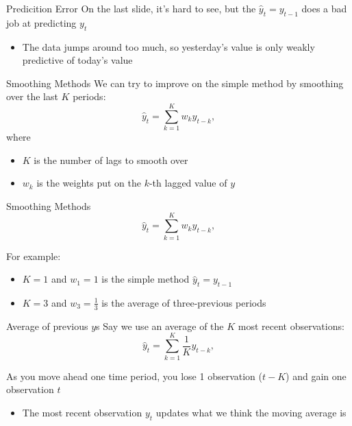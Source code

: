 \documentclass[aspectratio=169,t,11pt,table]{beamer}
\begin{document}

\begin{frame}{Predicition Error}
  On the last slide, it's hard to see, but the $\hat{y}_t = y_{t-1}$ does a bad job at predicting $y_t$
  \begin{itemize}
    \item The data jumps around too much, so yesterday's value is only weakly predictive of today's value
  \end{itemize}
\end{frame}

\begin{frame}{Smoothing Methods}
  We can try to improve on the simple method by smoothing over the last $K$ periods:
  $$
    \hat{y}_t = \sum_{k=1}^K w_k y_{t - k},
  $$
  where 
  \begin{itemize}
    \item $K$ is the number of lags to smooth over
    \item $w_k$ is the weights put on the $k$-th lagged value of $y$
  \end{itemize}
\end{frame}

\begin{frame}{Smoothing Methods}
  \vspace*{-\bigskipamount}
  $$
    \hat{y}_t = \sum_{k=1}^K w_k y_{t - k},
  $$
  
  \bigskip
  For example: 
  \begin{itemize}
    \item $K = 1$ and $w_1 = 1$ is the simple method $\hat{y}_t = y_{t-1}$
    
    \pause
    \item $K = 3$ and $w_3 = \frac{1}{3}$ is the average of three-previous periods
  \end{itemize}
\end{frame}

\begin{frame}{Average of previous $y$s}
  Say we use an average of the $K$ most recent observations:
  $$
    \hat{y}_t = \sum_{k=1}^K \frac{1}{K} y_{t - k},
  $$

  \pause
  \bigskip
  As you move ahead one time period, you lose 1 observation ($t - K$) and gain one observation $t$
  \begin{itemize}
    \item The most recent observation $y_t$ updates what we think the moving average is
  \end{itemize}
\end{frame}
\end{document}
